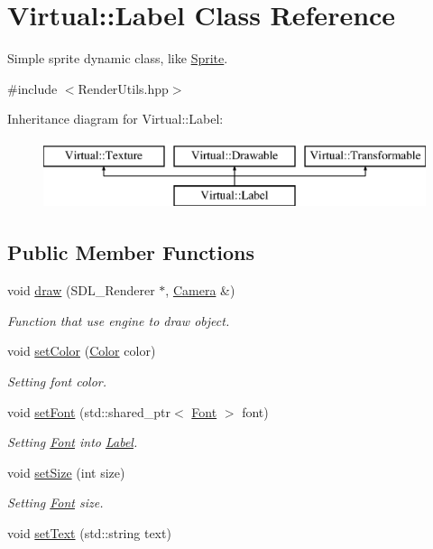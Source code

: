 \hypertarget{class_virtual_1_1_label}{}\section{Virtual\+:\+:Label Class Reference}
\label{class_virtual_1_1_label}


Simple sprite dynamic class, like \hyperlink{class_virtual_1_1_sprite}{Sprite}.  




{\ttfamily \#include $<$Render\+Utils.\+hpp$>$}

Inheritance diagram for Virtual\+:\+:Label\+:\begin{figure}[H]
\begin{center}
\leavevmode
\includegraphics[height=2.000000cm]{class_virtual_1_1_label}
\end{center}
\end{figure}
\subsection*{Public Member Functions}
\begin{DoxyCompactItemize}
\item 
void \hyperlink{class_virtual_1_1_label_a077d7852f09f940a9932f63fb616351c}{draw} (S\+D\+L\+\_\+\+Renderer $\ast$, \hyperlink{class_virtual_1_1_camera}{Camera} \&)
\begin{DoxyCompactList}\small\item\em Function that use engine to draw object. \end{DoxyCompactList}\item 
void \hyperlink{class_virtual_1_1_label_adf4f738abab5dca3815a9c6f4124eec6}{set\+Color} (\hyperlink{struct_virtual_1_1_color}{Color} color)
\begin{DoxyCompactList}\small\item\em Setting font color. \end{DoxyCompactList}\item 
void \hyperlink{class_virtual_1_1_label_a643dca9416c60c78b1b1fc234ed6964c}{set\+Font} (std\+::shared\+\_\+ptr$<$ \hyperlink{class_virtual_1_1_font}{Font} $>$ font)
\begin{DoxyCompactList}\small\item\em Setting \hyperlink{class_virtual_1_1_font}{Font} into \hyperlink{class_virtual_1_1_label}{Label}. \end{DoxyCompactList}\item 
void \hyperlink{class_virtual_1_1_label_a20e22a03b54b9851ad675c491df1ae75}{set\+Size} (int size)
\begin{DoxyCompactList}\small\item\em Setting \hyperlink{class_virtual_1_1_font}{Font} size. \end{DoxyCompactList}\item 
void \hyperlink{class_virtual_1_1_label_a1b737a96ea06f214120c61dc2465536f}{set\+Text} (std\+::string text)
\end{DoxyCompactItemize}

